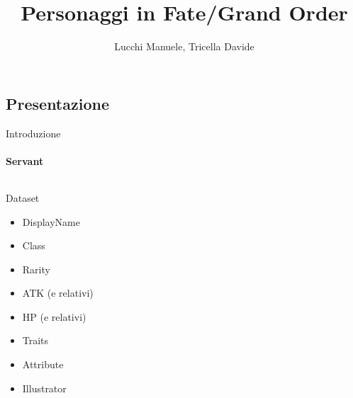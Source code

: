 \documentclass{beamer}
\title{Personaggi in Fate/Grand Order} %
\author{Lucchi Manuele, Tricella Davide}
\begin{document}
\frame[c]{\maketitle}

\begin{darkframes}

  \section{Presentazione}

  \begin{frame}{Introduzione}
    \framesubtitle{Servant}
    \begin{columns}
      \begin{column}{0.5\textwidth}
        Dataset
        \begin{itemize}
          \item DisplayName
          \item Class
          \item Rarity
          \item ATK (e relativi)
          \item HP (e relativi)
          \item Traits
          \item Attribute
          \item Illustrator
        \end{itemize}
      \end{column}
      \begin{column}{0.5\textwidth}
        \begin{figure}
          \centering

\end{figure}
\end{column}
\end{columns}
\end{frame}
\end{darkframes}
\end{document}
